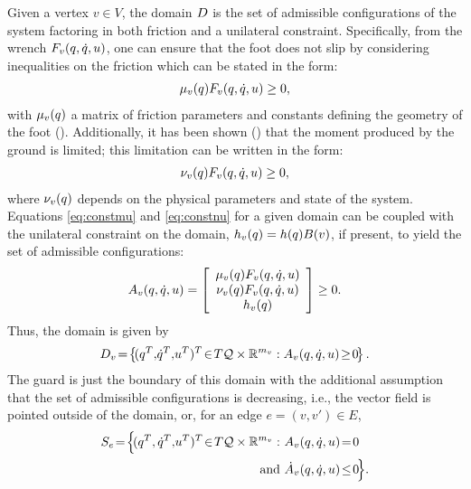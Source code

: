 Given a vertex $v \in V$, the domain $D$ is the set of admissible configurations of the system factoring in both friction and a unilateral constraint.
%
Specifically, from the wrench $F_{v}(q, \dot{q}, u)$, one can ensure that the foot does not slip by considering inequalities on the friction which can be stated in the form:
%
\begin{align}
  \label{eq:constmu}
  \mu_{v}(q) F_{v}(q, \dot{q}, u) \geq 0,
\end{align}
%
with $\mu_{v}(q)$ a matrix of friction parameters and constants defining the geometry of the foot (\cite{GCAS10}).
%
Additionally, it has been shown (\cite{CBAA09,VBSS90}) that the moment produced by the ground is limited; this limitation can be written in the form:
%
\begin{align}
  \label{eq:constnu}
  \nu_{v}(q) F_{v}(q, \dot{q}, u) \geq 0,
\end{align}
%
where $\nu_{v}(q)$ depends on the physical parameters and state of the system.
%
Equations \eqref{eq:constmu} and \eqref{eq:constnu} for a given domain can be coupled with the unilateral constraint on the domain, $h_{v}(q) = h(q) B(v)$, if present, to yield the set of admissible configurations:
%
\begin{align}
  \label{admissible}
  A_{v}(q, \dot{q}, u) = \left[ \begin{array}{c}
      \mu_{v}(q) F_{v}(q, \dot{q}, u)\\
      \nu_{v}(q) F_{v}(q, \dot{q}, u)\\
      h_{v}(q)
    \end{array} \right] \geq 0.
\end{align}
%
Thus, the domain is given by
%
\begin{align}
  \label{eq:domain}
  \D_{v} \! = \! \left\{ \! (q^{T}, \! {\dot q}^{T}, \! \u^{T})^{T} \! \in \! T\Q \times \R^{m_{v}} : A_{v}\argsqdqu \! \geq \! 0 \! \right\}.
\end{align}
%
The guard is just the boundary of this domain with the additional assumption that the set of admissible configurations is decreasing, i.e., the vector field is pointed outside of the domain, or, for an edge $e = (v, v') \in E$,
%
\begin{align}
  S_{e} \! = \! \Bigl\{ \!(\q^{T}, \dq^{T}, \! \u^{T})^{T} \! \in \! T\Q \times \R^{m_v} : \ &A_{v}\argsqdqu \! = \! 0 \\
  \nonumber
  \mathrm{and} \ &{\dot A}_{v}\argsqdqu \! \leq \! 0 \! \Bigl\}.
\end{align}

